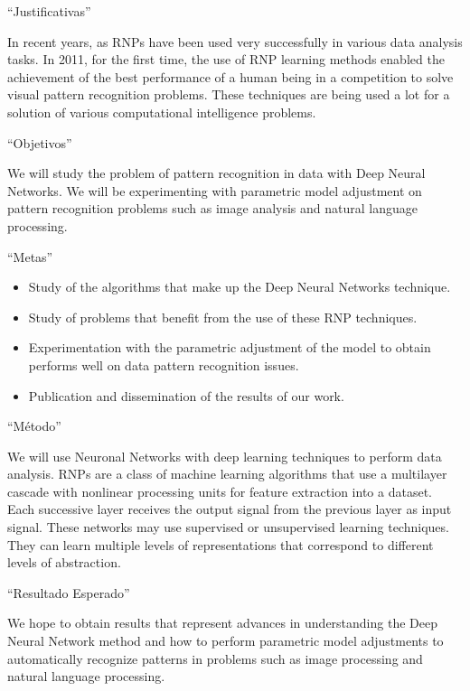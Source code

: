 ``Justificativas''

In recent years, as RNPs have been used very successfully in various data analysis
tasks. In 2011, for the first time, the use of RNP learning methods enabled the achievement
of the best performance of a human being in a competition to solve visual pattern
recognition problems. These techniques are being used a lot for a solution of various
computational intelligence problems.


``Objetivos''

We will study the problem of pattern recognition in data with Deep Neural Networks.
We will be experimenting with parametric model adjustment on pattern recognition problems
such as image analysis and natural language processing.


``Metas''

\begin{itemize}
  \item Study of the algorithms that make up the Deep Neural Networks technique.
  \item Study of problems that benefit from the use of these RNP techniques.
  \item Experimentation with the parametric adjustment of the model to obtain
  performs well on data pattern recognition issues.
  \item Publication and dissemination of the results of our work.
\end{itemize}


``M\'{e}todo''

We will use Neuronal Networks with deep learning techniques to perform data analysis.
RNPs are a class of machine learning algorithms that use a multilayer cascade with
nonlinear processing units for feature extraction into a dataset. Each successive
layer receives the output signal from the previous layer as input signal. These networks
may use supervised or unsupervised learning techniques. They can learn multiple
levels of representations that correspond to different levels of abstraction.


``Resultado Esperado''

We hope to obtain results that represent advances in understanding the Deep Neural
Network method and how to perform parametric model adjustments to automatically
recognize patterns in problems such as image processing and natural language processing.
